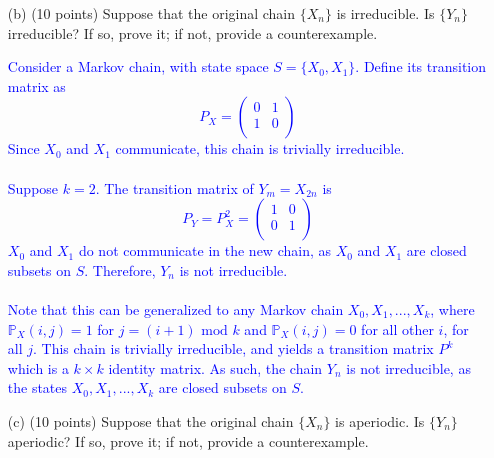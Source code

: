 \documentclass{article}
\begin{document}
\begin{enumerate}
{%
}

        
        \item[(b)] (10 points) Suppose that the original chain $\{X_n\}$ is irreducible. Is $\{Y_n\}$ irreducible? If so, prove it; if not, provide a counterexample.

            \textcolor{blue}{
            Consider a Markov chain, with state space $S=\{X_0, X_1\}$. Define its transition matrix as $$P_X=
  \left( {\begin{array}{cc}
   0 & 1 \\
   1 & 0 \\
  \end{array} } \right)$$
  Since $X_0$ and $X_1$ communicate, this chain is trivially irreducible. \\ \\ 
  Suppose $k=2$. The transition matrix of $Y_m=X_{2n}$ is $$P_Y=P_X^2=\left( {\begin{array}{cc}
   1 & 0 \\
   0 & 1 \\
  \end{array} } \right)$$
  $X_0$ and $X_1$ do not communicate in the new chain, as $X_0$ and $X_1$ are closed subsets on $S$. Therefore, $Y_n$ is not irreducible. \\ \\ 
  Note that this can be generalized to any Markov chain $X_0, X_1,...,X_k$, where $\mathbb{P}_X(i,j)=1$ for $j = (i + 1) \text{ mod } k$ and $\mathbb{P}_X(i,j)=0$ for all other $i$, for all $j$. This chain is trivially irreducible, and yields a transition matrix $P^k$ which is a $k\times k$ identity matrix. As such, the chain $Y_n$ is not irreducible, as the states $X_0, X_1,...,X_k$ are closed subsets on $S$.
               }

        
        \item[(c)] (10 points) Suppose that the original chain $\{X_n\}$ is aperiodic. Is $\{Y_n\}$ aperiodic? If so, prove it; if not, provide a counterexample.


\end{enumerate}
\end{document}
